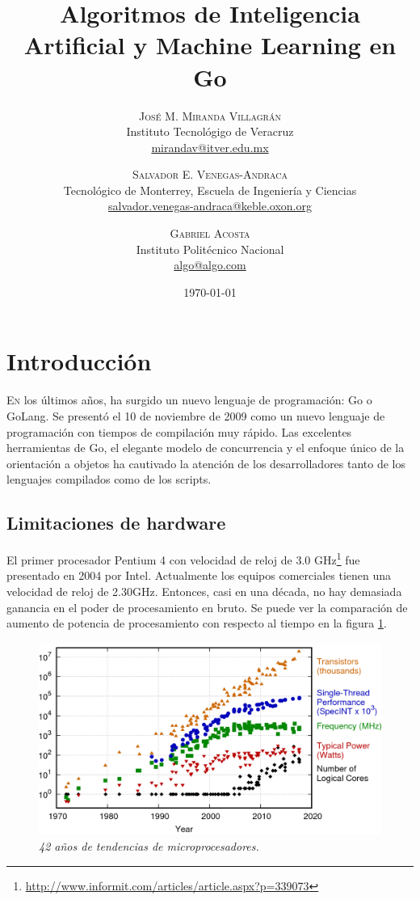 \documentclass[twoside,twocolumn]{article}
\title{Algoritmos de Inteligencia Artificial y Machine Learning en Go} %
\author{%
\textsc{José M. Miranda Villagrán} \\[1ex] %
\normalsize Instituto Tecnológigo de Veracruz \\ %
\normalsize \href{mailto:mirandav@itver.edu.mx}{mirandav@itver.edu.mx} %
\and %
\textsc{Salvador E. Venegas-Andraca} \\[1ex] %
\normalsize Tecnológico de Monterrey, Escuela de Ingeniería y Ciencias \\ %
\normalsize \href{mailto:salvador.venegas-andraca@keble.oxon.org}{salvador.venegas-andraca@keble.oxon.org} %
\and %
\textsc{Gabriel Acosta} \\[1ex] %
\normalsize Instituto Politécnico Nacional \\ %
\normalsize \href{mailto:algo@algo.com}{algo@algo.com} %
}
\date{\today} %
\begin{document}
\maketitle


\section{Introducción}

\lettrine[nindent=0em,lines=3]{E} n los últimos años, ha surgido un nuevo lenguaje de programación: Go o GoLang. Se presentó el 10 de noviembre de 2009 como un nuevo lenguaje de programación con tiempos de compilación muy rápido. Las excelentes herramientas de Go, el elegante modelo de concurrencia y el enfoque único de la orientación a objetos ha cautivado la atención de los desarrolladores tanto de los lenguajes compilados como de los scripts.

\subsection{Limitaciones de hardware}

El primer procesador Pentium 4 con velocidad de reloj de 3.0 GHz\footnote{\url{ http://www.informit.com/articles/article.aspx?p=339073}} fue presentado en 2004 por Intel. Actualmente los equipos comerciales tienen una velocidad de reloj de 2.30GHz. Entonces, casi en una década, no hay demasiada ganancia en el poder de procesamiento en bruto. Se puede ver la comparación de aumento de potencia de procesamiento con respecto al tiempo en la figura \ref{fig1}.

\begin{figure}[htbp]
	\centerline{\includegraphics[scale=0.22]{img/42-years-processor-trend.png}}
	\caption{\textit{42 años de tendencias de microprocesadores.}}
	\label{fig1}
\end{figure}
\end{document}
